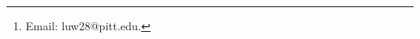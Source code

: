 \documentclass[12pt]{article}
\theoremstyle{plain}
\theoremstyle{definition}
\begin{document}
 


\title{}  
\author{Luca Wrabetz\thanks{Email: luw28@pitt.edu.}}
\date{Department of Industrial Engineering, University of Pittsburgh \\ [2ex] 
\today}

\maketitle 


\begin{abstract} 
\medskip
{} 
\end{abstract} 




\end{document}
